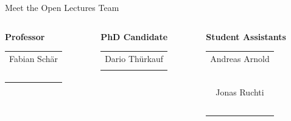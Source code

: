\documentclass[handout]{beamer}
\begin{document}
\begin{frame}{Meet the Open Lectures Team}
	\begin{columns}[T]
		\begin{column}{0.31\textwidth}
			\center \textbf{Professor}
			\begin{table}\small
				\begin{tabular}{c}
					Fabian Schär\\
					\href{https://linkedin.com/in/fabian-schaer/}{\faLinkedinSquare}\ \href{https://twitter.com/fschaer}{\faTwitterSquare}\\
				\end{tabular}
			\end{table}
		\end{column}
		\begin{column}{0.31\textwidth}
			\center \textbf{PhD Candidate}
			\begin{table}\small
				\begin{tabular}{c}
					Dario Thürkauf\\
					\href{https://linkedin.com/in/dario-thuerkauf/}{\faLinkedinSquare} \href{https://twitter.com/dario_thuerkauf}{\faTwitterSquare}\\
				\end{tabular}
			\end{table}
		\end{column}
		\begin{column}{0.31\textwidth}
			\center \textbf{Student Assistants}
			\begin{table}\small
				\begin{tabular}{c}
					Andreas Arnold\\
					\href{https://www.linkedin.com/in/andreas-arnold-170a20225/}{\faLinkedinSquare}\ \href{}{\faTwitterSquare}\\
					\vspace{0.5em}\\
					Jonas Ruchti\\
					\href{https://www.linkedin.com/in/jonas-ruchti-a29042221/}{\faLinkedinSquare}\ \href{https://twitter.com/jonas_ruchti}{\faTwitterSquare}\\
				\end{tabular}
			\end{table}
		\end{column}
	\end{columns}
\end{frame}
\end{document}
